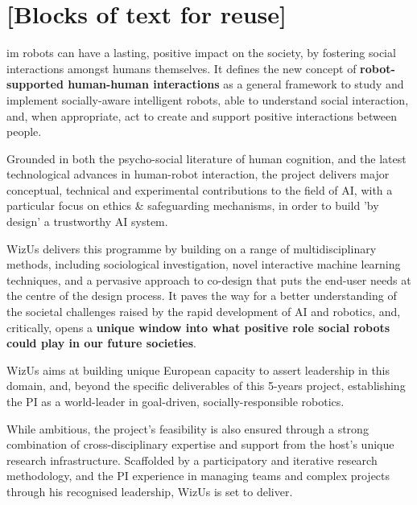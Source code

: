 \documentclass[11pt,a4paper]{report}
\newcommand{\project}{WizUs\xspace}
\begin{document}
\section{[Blocks of text for reuse]}


im robots can have a lasting, positive
impact on the society, by fostering social interactions amongst humans
themselves. It defines the new concept of \textbf{robot-supported human-human
interactions} as a general framework to study and implement socially-aware
intelligent robots, able to understand social interaction, and, when
appropriate, act to create and support positive interactions between people.


Grounded in both the psycho-social literature of human cognition, and the latest
technological advances in human-robot interaction, the project delivers
major conceptual, technical and experimental contributions to the field of AI, 
with a particular focus on ethics \& safeguarding mechanisms, in order to build 'by 
design' a trustworthy AI system.

\project delivers this programme by building on a range of multidisciplinary
methods, including sociological investigation, novel interactive machine
learning techniques, and a pervasive approach to co-design that puts the
end-user needs at the centre of the design process. It paves the way for a
better understanding of the societal challenges raised by the rapid development
of AI and robotics, and, critically, opens a \textbf{unique window into what
positive role social robots could play in our future societies}.




\project aims at building unique European capacity to assert leadership in this
domain, and, beyond the specific deliverables of this 5-years project,
establishing the PI as a world-leader in goal-driven, socially-responsible
robotics.



While ambitious, the project's feasibility is also ensured through a strong
combination of cross-disciplinary expertise and support from the host's unique
research infrastructure. Scaffolded by a participatory and iterative research
methodology, and the PI experience in managing teams and complex projects
through his recognised leadership, \project is set to deliver.
\end{document}
